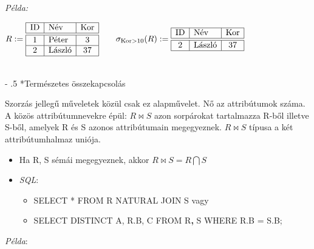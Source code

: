 \documentclass[tikz,12pt,margin=0px]{article}
\makeatletter
\renewcommand\paragraph{%
	\@startsection{paragraph}{4}{0mm}%
	{-\baselineskip}%
	{.5\baselineskip}%
	{\normalfont\normalsize\bfseries}}
\makeatother
\begin{document}
   \noindent \textit{Példa:}

    \begin{center}
        $R := \begin{array}{|c|l|c|}
            \hline
            \text{ID} & \text{Név} & \text{Kor} \\ \hline \hline
            1 & \text{Péter} & 3  \\ \hline
            2 & \text{László} & 37 \\ \hline
        \end{array} \qquad \sigma_{\text{Kor} > 10}(R) :=
        \begin{array}{|c|l|c|}
            \hline
            \text{ID} & \text{Név} & \text{Kor} \\ \hline \hline
            2 & \text{László} & 37 \\\hline
        \end{array}$
    \end{center}

    \ \\

    \paragraph*{Természetes összekapcsolás}

    Szorzás jellegű műveletek közül csak ez alapművelet. Nő az attribútumok száma. A közös attribútumnevekre épül: $R \bowtie S$ azon sorpárokat tartalmazza R-ből illetve S-ből, amelyek R és S azonos attribútumain megegyeznek. $R \bowtie S$ típusa a két attribútumhalmaz uniója.
    \begin{itemize}
        \item Ha R, S sémái megegyeznek, akkor $R \bowtie S = R \bigcap S$
        \item \emph{SQL}:
        \begin{itemize}
            \item SELECT * FROM R NATURAL JOIN S vagy
            \item SELECT DISTINCT A, R.B, C FROM R\textbf{,} S WHERE R.B = S.B;
        \end{itemize}
    \end{itemize}

    \noindent \textit{Példa}:
\end{document}
